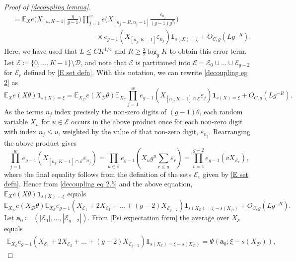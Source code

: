 \documentclass[hidelinks,11pt,reqno]{amsart}
\renewcommand{\leq}{\leqslant}
\renewcommand{\geq}{\geqslant}
\newcommand{\E}{\ensuremath{\mathbb{E}}}
\newcommand{\ind}{\mathbf{1}}
\newcommand{\xb}{X}
\newcommand{\xbd}{X_{\mathcal{D}}}
\newcommand{\xbee}{X_{\mathcal{E}}}
\newcommand{\ru}[1]{e_{g-1}(#1)}
\newcommand{\sx}[1]{s(#1)}
\theoremstyle{remark}
\begin{document}
\begin{proof}[Proof of \cref{decoupling lemma}]
\begin{align}
    &=\E_{\xb}e\Big(\xb_{[u,K-1]}\frac{\eta}{g-1}\Big)\prod_{j=1}^{w}e\Big (\xb_{[n_{j}-R,n_{j}-1]}\frac{\varepsilon_{n_{j}}}{(g-1)g^{n_{j}}}\Big)\nonumber\\&\hspace{12em}\times \ru{\xb_{[n_{j},K-1]}\varepsilon_{n_{j}}}\ind_{\sx{\xb}=\xi}+O_{C,g}(L g^{-R}).\label{decoupling eg 2}\end{align}
    Here, we have used that $L\leq CK^{1/4}$ and $R\geq \tfrac{3}{2}\log_{g}K$ to obtain this error term.
Let $\mathcal{E}\coloneq \{0,\ldots, K-1\}\setminus \mathcal{D}$, and note that $\mathcal{E} $ is partitioned into $\mathcal{E}= \mathcal{E}_{0}\cup \ldots \cup \mathcal{E}_{g-2}$ for $\mathcal{E}_{r}$ defined by \cref{E set defn}. With this notation, we can rewrite \cref{decoupling eg 2} as
\begin{equation}\label{decoupling eq 2.5}\E_{X}e(X\theta)\ind_{s(X)=\xi}=\E_{\xbd}e(\xbd\theta)\E_{\xbee}\prod_{j=1}^{w}\ru{\xb_{[n_{j},K-1]\cap \mathcal{E}}\varepsilon_{j}}\ind_{\sx{\xb}=\xi}+O_{C,g}(L g^{-R}).\end{equation}
As the terms $n_{j}$ index precisely the non-zero digits of $(g-1)\theta$, each random variable $X_{u}$ for $u\in \mathcal{E}$ occurs in the above product once for each non-zero digit with index $n_{j}\leq u$, weighted by the value of that non-zero digit, $\varepsilon_{n_{j}}$. Rearranging the above product gives
        \[\prod_{j=1}^{w}\ru{\xb_{[n_{j},K-1]\cap \mathcal{E}}\varepsilon_{n_{j}}}=\prod_{u\in \mathcal{E}}\ru{X_{u}g^{u}\sum_{r\leq u}\varepsilon_{r}}=\prod_{v=1}^{g-2}\ru{v\xb_{\mathcal{E}_{v}}},\]
where the final equality follows from the definition of the sets $\mathcal{E}_{v}$ given by \cref{E set defn}. Hence from \cref{decoupling eq 2.5} and the above equation, $\E_{X}e(X\theta)\ind_{s(X)=\xi}$ equals
    \begin{equation}\label{decoupling eq 3}
        \E_{\xbd}e(\xbd\theta) \E_{\xbee}\ru{\xb_{\mathcal{E}_{1}}+2\xb_{\mathcal{E}_{2}}+\ldots+(g-2)\xb_{\mathcal{E}_{g-2}}}\ind_{\sx{\xbee}=\xi-\sx{\xbd}}+O_{C,g}(L g^{-R}).
    \end{equation}
Let $\mathbf{a}_{0}\coloneq(|\mathcal{E}_{0}|,\ldots,|\mathcal{E}_{g-2}|)$. From \cref{Psi expectation form} the average over $\xbee$ equals
\begin{align*}\label{decoupling psi for a0}
   \E_{\xbee}\ru{\xb_{\mathcal{E}_{1}}+2\xb_{\mathcal{E}_{2}}+\ldots+(g-2)\xb_{\mathcal{E}_{g-2}}}\ind_{\sx{\xbee}=\xi-\sx{\xbd}}=\Psi(\mathbf{a}_{0};\xi-\sx{\xbd}),
\end{align*}

\end{proof}
\end{document}
